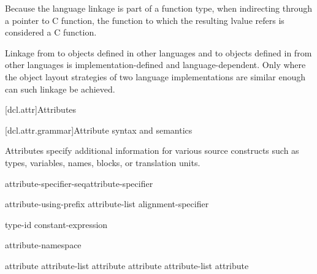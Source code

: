 \pnum
\begin{note}
Because the language linkage is part of a function type, when
indirecting through a pointer to C function, the function to
which the resulting lvalue refers is considered a C function.
\end{note}

\pnum
{}%
%
Linkage from \Cpp to objects defined in other languages and to objects
defined in \Cpp from other languages is implemen\-tation-defined and
language-dependent. Only where the object layout strategies of two
language implementations are similar enough can such linkage be
achieved.%

[dcl.attr]{Attributes}%

[dcl.attr.grammar]{Attribute syntax and semantics}

\pnum
{}%
Attributes specify additional information for various source constructs
such as types, variables, names, blocks, or translation units.

\begin{bnf}
\br
  attribute-specifier-seq\opt attribute-specifier
\end{bnf}

\begin{bnf}
\br
  \terminal{[} \terminal{[} attribute-using-prefix\opt{} attribute-list \terminal{]} \terminal{]}\br
  alignment-specifier
\end{bnf}

\begin{bnf}
\br
   type-id \opt{} \terminal{)}\br
   constant-expression \opt{} \terminal{)}
\end{bnf}

\begin{bnf}
\br
   attribute-namespace \terminal{:}
\end{bnf}

\begin{bnf}
\br
  attribute\opt\br
  attribute-list \terminal{,} attribute\opt\br
  attribute \br
  attribute-list \terminal{,} attribute 
\end{bnf}


